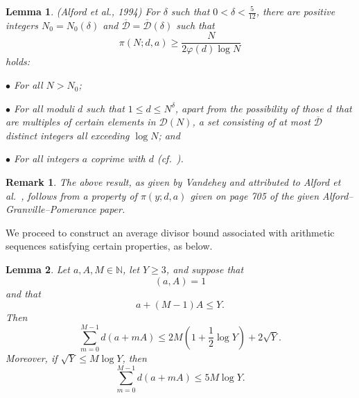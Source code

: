 \documentclass[12pt]{article}
\newtheorem{lemma}{Lemma}%
\newtheorem{remark}{Remark}
\begin{document}
\begin{lemma}\label{Alfordetal}
 (Alford et al., 1994) For $\delta$ such that $0 < \delta < \frac{5}{12}$, there are positive integers $N_{0} = N_{0}(\delta)$ and 
 $\overline{\mathcal{D}} = \overline{\mathcal{D}}(\delta)$ such that 
\begin{equation}\label{countarithmetic} 
 \pi(N; d, a) \geq \frac{N}{ 2 \varphi(d) \log N } 
\end{equation}
 holds: 

\vspace{0.1in}

\noindent $\bullet$ For all $N > N_ 0$; 

\vspace{0.1in}

\noindent $\bullet$ For all moduli $d$ such that $1 \leq d \leq N^{\delta}$, apart from the possibility of those $d$ that are multiples of 
 certain elements in $\mathcal{D}(N)$, a set consisting of at most $\overline{\mathcal{D}}$ distinct integers all exceeding $\log N$; and 

\vspace{0.1in}

\noindent $\bullet$ For all integers $a$ coprime with $d$ \cite{AlfordGranvillePomerance1994} (cf.\ \cite{Vandehey2013}). 

\end{lemma}

\begin{remark}\label{remarkAGP}
 The above result, as given by Vandehey \cite{Vandehey2013}
 and attributed to Alford et al.\ \cite{AlfordGranvillePomerance1994}, 
 follows from a property of $\pi(y;d,a)$ given on page 705 of the given 
 Alford--Granville--Pomerance paper. 
\end{remark}

 We proceed to construct an average divisor bound associated with arithmetic sequences satisfying certain properties, as below. 

\begin{lemma}\label{basiclogbound}
 Let $a, A, M \in \mathbb{N}$, let $Y \geq 3$, and suppose that 
\begin{equation}\label{aA1} 
 (a, A) = 1 
\end{equation}
 and that 
\begin{equation}\label{aM1Ay} 
 a + (M - 1) A \leq Y. 
\end{equation}
 Then $$ \sum_{m=0}^{M-1} d(a + m A) \leq 2 M \left( 1 + \frac{1}{2} \log Y \right) + 2 \sqrt{Y}. $$ Moreover, if $ \sqrt{Y} \leq M \log 
 Y$, then 
\begin{equation}\label{withsqrtMlog}
 \sum_{m=0}^{M-1} d(a + m A) \leq 5 M \log Y. 
\end{equation}
\end{lemma}
\end{document}
